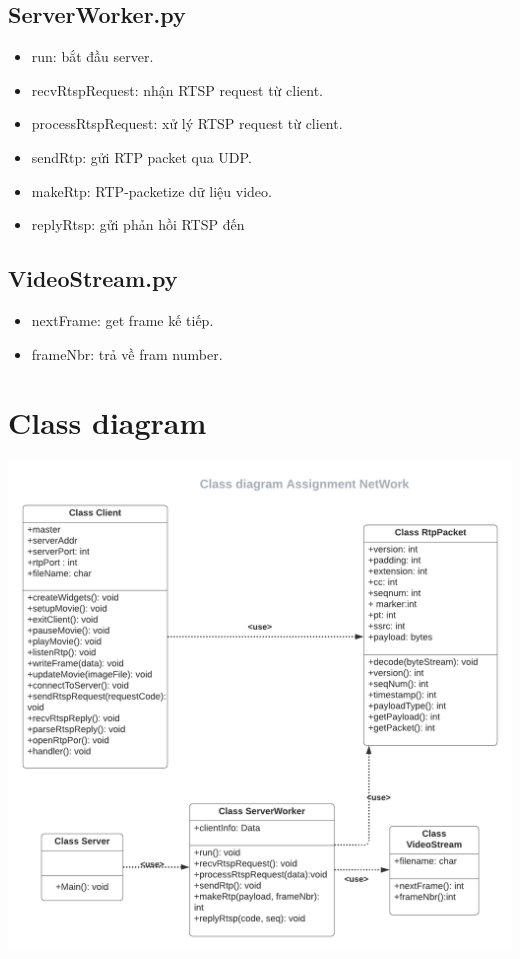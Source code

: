 \documentclass[12pt,a4paper]{article}
\begin{document}
\subsection{ServerWorker.py}
\begin{itemize}
\item run: bắt đầu server.
\item recvRtspRequest: nhận RTSP request từ client.
\item processRtspRequest: xử lý RTSP request từ client.
\item sendRtp: gửi RTP packet qua UDP.
\item makeRtp: RTP-packetize dữ liệu video.
\item replyRtsp: gửi phản hồi RTSP đến 
\end{itemize}
\subsection{VideoStream.py}
\begin{itemize}
\item nextFrame: get frame kế tiếp.
\item frameNbr: trả về fram number.
\end{itemize}
\section{Class diagram}
\includegraphics[scale=0.4]{class.png} 
\end{document}
